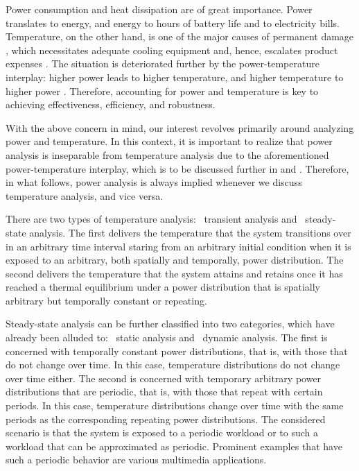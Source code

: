 Power consumption and heat dissipation are of great importance. Power translates
to energy, and energy to hours of battery life and to electricity bills.
Temperature, on the other hand, is one of the major causes of permanent damage
\cite{jedec2016}, which necessitates adequate cooling equipment and, hence,
escalates product expenses \cite{chaudhry2015}. The situation is deteriorated
further by the power-temperature interplay: higher power leads to higher
temperature, and higher temperature to higher power \cite{liu2007}. Therefore,
accounting for power and temperature is key to achieving effectiveness,
efficiency, and robustness.

With the above concern in mind, our interest revolves primarily around analyzing
power and temperature. In this context, it is important to realize that power
analysis is inseparable from temperature analysis due to the aforementioned
power-temperature interplay, which is to be discussed further in
 and . Therefore, in what
follows, power analysis is always implied whenever we discuss temperature
analysis, and vice versa.

There are two types of temperature analysis: \one~transient analysis and
\two~steady-state analysis. The first delivers the temperature that the system
transitions over in an arbitrary time interval staring from an arbitrary initial
condition when it is exposed to an arbitrary, both spatially and temporally,
power distribution. The second delivers the temperature that the system attains
and retains once it has reached a thermal equilibrium under a power distribution
that is spatially arbitrary but temporally constant or repeating.

Steady-state analysis can be further classified into two categories, which have
already been alluded to: \one~static analysis and \two~dynamic analysis. The
first is concerned with temporally constant power distributions, that is, with
those that do not change over time. In this case, temperature distributions do
not change over time either. The second is concerned with temporary arbitrary
power distributions that are periodic, that is, with those that repeat with
certain periods. In this case, temperature distributions change over time with
the same periods as the corresponding repeating power distributions. The
considered scenario is that the system is exposed to a periodic workload or to
such a workload that can be approximated as periodic. Prominent examples that
have such a periodic behavior are various multimedia applications.

